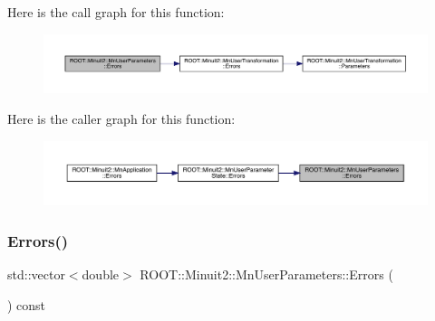 Here is the call graph for this function\+:
\nopagebreak
\begin{figure}[H]
\begin{center}
\leavevmode
\includegraphics[width=350pt]{d6/d10/classROOT_1_1Minuit2_1_1MnUserParameters_a7cae98f6146725427e852655cee7a857_cgraph}
\end{center}
\end{figure}
Here is the caller graph for this function\+:
\nopagebreak
\begin{figure}[H]
\begin{center}
\leavevmode
\includegraphics[width=350pt]{d6/d10/classROOT_1_1Minuit2_1_1MnUserParameters_a7cae98f6146725427e852655cee7a857_icgraph}
\end{center}
\end{figure}
\mbox{\label{classROOT_1_1Minuit2_1_1MnUserParameters_abcc81c5cff7f9af0d10e2622c5d715c7}} 
\subsubsection{\texorpdfstring{Errors()}{Errors()}\hspace{0.1cm}{\footnotesize\ttfamily [2/3]}}
{\footnotesize\ttfamily std\+::vector$<$double$>$ R\+O\+O\+T\+::\+Minuit2\+::\+Mn\+User\+Parameters\+::\+Errors (\begin{DoxyParamCaption}{ }\end{DoxyParamCaption}) const}

\mbox{\label{classROOT_1_1Minuit2_1_1MnUserParameters_abcc81c5cff7f9af0d10e2622c5d715c7}} 
